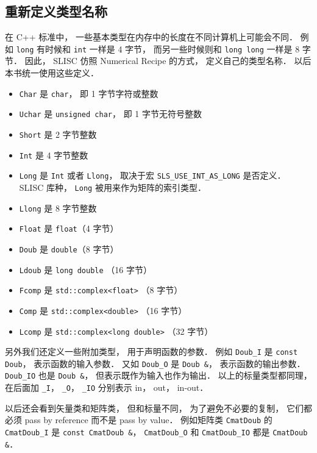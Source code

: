 \subsection{重新定义类型名称}
在 C++ 标准中， 一些基本类型在内存中的长度在不同计算机上可能会不同． 例如 \verb|long| 有时候和 \verb|int| 一样是 4 字节， 而另一些时候则和 \verb|long long| 一样是 8 字节． 因此， SLISC 仿照 Numerical Recipe 的方式， 定义自己的类型名称． 以后本书统一使用这些定义．
\begin{itemize}
\item \verb|Char| 是 \verb|char|， 即 1 字节字符或整数
\item \verb|Uchar| 是 \verb|unsigned char|， 即 1 字节无符号整数
\item \verb|Short| 是 2 字节整数
\item \verb|Int| 是 4 字节整数
\item \verb|Long| 是 \verb|Int| 或者 \verb|Llong|， 取决于宏 \verb|SLS_USE_INT_AS_LONG| 是否定义． SLISC 库种， \verb|Long| 被用来作为矩阵的索引类型．
\item \verb|Llong| 是 8 字节整数
\item \verb|Float| 是 \verb|float|（4 字节）
\item \verb|Doub| 是 \verb|double|（8 字节）
\item \verb|Ldoub| 是 \verb|long double| （16 字节）
\item \verb|Fcomp| 是 \verb|std::complex<float>| （8 字节）
\item \verb|Comp| 是 \verb|std::complex<double>| （16 字节）
\item \verb|Lcomp| 是 \verb|std::complex<long double>| （32 字节）
\end{itemize}
另外我们还定义一些附加类型， 用于声明函数的参数． 例如 \verb|Doub_I| 是 \verb|const Doub|， 表示函数的输入参数． 又如 \verb|Doub_O| 是 \verb|Doub &|， 表示函数的输出参数． \verb|Doub_IO| 也是 \verb|Doub &|， 但表示既作为输入也作为输出． 以上的标量类型都同理， 在后面加 \verb|_I|， \verb|_O|， \verb|_IO| 分别表示 in， out， in-out．

以后还会看到矢量类和矩阵类， 但和标量不同， 为了避免不必要的复制， 它们都必须 pass by reference 而不是 pass by value． 例如矩阵类 \verb|CmatDoub| 的 \verb|CmatDoub_I| 是 \verb|const CmatDoub &|， \verb|CmatDoub_O| 和 \verb|CmatDoub_IO| 都是 \verb|CmatDoub &|．
